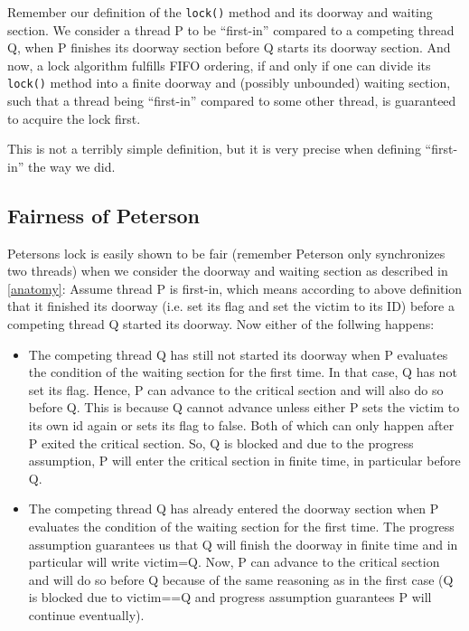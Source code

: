 \documentclass{article}
\begin{document}
    Remember our definition of the \texttt{lock()} method and its doorway and waiting section. We consider a thread P to be ``first-in'' compared to a competing thread Q, when P finishes its doorway section before Q starts its doorway section. And now, a lock algorithm fulfills FIFO ordering, if and only if one can divide its \texttt{lock()} method into a finite doorway and (possibly unbounded) waiting section, such that a thread being ``first-in'' compared to some other thread, is guaranteed to acquire the lock first.

    This is not a terribly simple definition, but it is very precise when defining ``first-in'' the way we did.

    \subsection{Fairness of Peterson}
    Petersons lock is easily shown to be fair (remember Peterson only synchronizes two threads) when we consider the doorway and waiting section as described in \ref{anatomy}: Assume thread P is first-in, which means according to above definition that it finished its doorway (i.e. set its flag and set the victim to its ID) before a competing thread Q started its doorway. Now either of the follwing happens:

    \begin{itemize}
      \item The competing thread Q has still not started its doorway when P evaluates the condition of the waiting section for the first time. In that case, Q has not set its flag. Hence, P can advance to the critical section and will also do so before Q. This is because Q cannot advance unless either P sets the victim to its own id again or sets its flag to false. Both of which can only happen after P exited the critical section. So, Q is blocked and due to the progress assumption, P will enter the critical section in finite time, in particular before Q.
      \item The competing thread Q has already entered the doorway section when P evaluates the condition of the waiting section for the first time. The progress assumption guarantees us that Q will finish the doorway in finite time and in particular will write victim=Q. Now, P can advance to the critical section and will do so before Q because of the same reasoning as in the first case (Q is blocked due to victim==Q and progress assumption guarantees P will continue eventually).
    \end{itemize}
\end{document}
